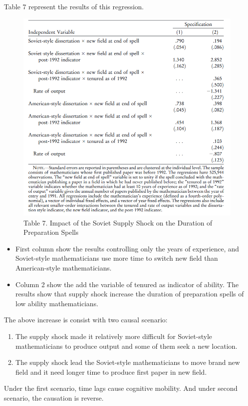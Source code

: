 \documentclass[../root]{subfiles}
\begin{document}
    Table 7 represent the results of this regression.
    \begin{figure}
        \centering
        \includegraphics[width = \linewidth]{_images/0918sugiyama/Table_7.png}
        \caption{Table 7. Impact of the Soviet Supply Shock on the Duration of Preparation Spells}
        \label{fig:my_label}
    \end{figure}
    
    \begin{itemize}
        \item First column show the results controlling only the years of experience, and Soviet-style mathematicians use more time to switch new field than American-style mathematicians.
        \item Column 2 show the add the variable of tenured as indicator of ability. The results show that supply shock increase the duration of preparation spells of low ability mathematicians. 
    \end{itemize}
    
    The above increase is consist with two causal scenario:
    \begin{enumerate}
        \item The supply shock made it relatively more difficult for Soviet-style mathematicians to produce output and some of them seek a new location.
        \item The supply shock lead the Soviet-style mathematicians to move brand new field and it need longer time to produce first paper in new field. 
    \end{enumerate}
    Under the first scenario, time lags cause cognitive mobility. And under second scenario, the causation is reverse. 
    
\end{document}
